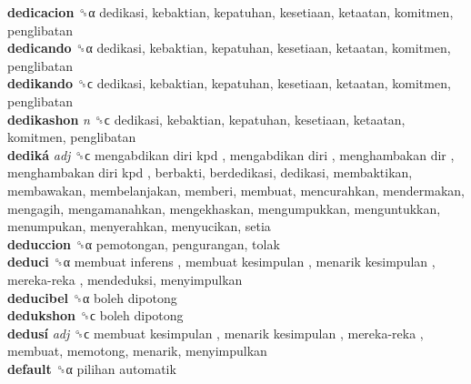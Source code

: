 \textbf{dedicacion} ␝α  dedikasi, kebaktian, kepatuhan, kesetiaan, ketaatan, komitmen, penglibatan  \\
\textbf{dedicando} ␝α  dedikasi, kebaktian, kepatuhan, kesetiaan, ketaatan, komitmen, penglibatan  \\
\textbf{dedikando} ␝ϲ  dedikasi, kebaktian, kepatuhan, kesetiaan, ketaatan, komitmen, penglibatan  \\
\textbf{dedikashon} \emph{n}  ␝ϲ  dedikasi, kebaktian, kepatuhan, kesetiaan, ketaatan, komitmen, penglibatan  \\
\textbf{dediká} \emph{adj}  ␝ϲ   mengabdikan diri kpd ,  mengabdikan diri ,  menghambakan dir ,  menghambakan diri kpd , berbakti, berdedikasi, dedikasi, membaktikan, membawakan, membelanjakan, memberi, membuat, mencurahkan, mendermakan, mengagih, mengamanahkan, mengekhaskan, mengumpukkan, menguntukkan, menumpukan, menyerahkan, menyucikan, setia  \\
\textbf{deduccion} ␝α  pemotongan, pengurangan, tolak  \\
\textbf{deduci} ␝α   membuat inferens ,  membuat kesimpulan ,  menarik kesimpulan ,  mereka-reka , mendeduksi, menyimpulkan  \\
\textbf{deducibel} ␝α   boleh dipotong   \\
\textbf{dedukshon} ␝ϲ   boleh dipotong   \\
\textbf{dedusí} \emph{adj}  ␝ϲ   membuat kesimpulan ,  menarik kesimpulan ,  mereka-reka , membuat, memotong, menarik, menyimpulkan  \\
\textbf{default} ␝α   pilihan automatik   \\

